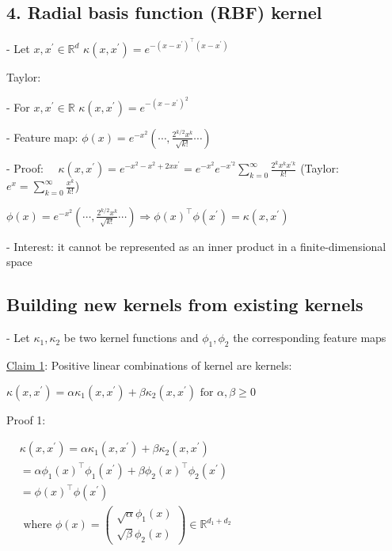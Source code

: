 \subsection*{4. Radial basis function (RBF) kernel}
- Let $x, x^{\prime} \in \mathbb{R}^{d}$
$
\kappa\left(x, x^{\prime}\right)=e^{-\left(x-x^{\prime}\right)^{\top}\left(x-x^{\prime}\right)}
$

Taylor: 

- For $x, x^{\prime} \in \mathbb{R}$
$
\kappa\left(x, x^{\prime}\right)=e^{-\left(x-x^{\prime}\right)^{2}}
$

- Feature map:
$
\phi(x)=e^{-x^{2}}\left(\cdots, \frac{2^{k / 2} x^{k}}{\sqrt{k !}} \cdots\right)
$

- Proof: $\quad \kappa\left(x, x^{\prime}\right)=e^{-x^{2}-x^{2}+2 x x^{\prime}}
=e^{-x^{2}} e^{-x^{\prime 2}} \sum_{k=0}^{\infty} \frac{2^{k} x^{k} x^{\prime k}}{k !}$
(Taylor: $e^{x}=\sum_{k=0}^{\infty}\frac{x^{k}}{k!}$)

$
\phi(x)=e^{-x^{2}}\left(\cdots, \frac{2^{k / 2} x^{k}}{\sqrt{k !}} \cdots\right) \Longrightarrow \phi(x)^{\top} \phi\left(x^{\prime}\right)=\kappa\left(x, x^{\prime}\right)
$

- Interest: it cannot be represented as an inner product in a finite-dimensional space

\subsection*{Building new kernels from existing kernels}
- Let $\kappa_{1}, \kappa_{2}$ be two kernel functions and $\phi_{1}, \phi_{2}$ the corresponding feature maps

\underline{Claim 1}: Positive linear combinations of kernel are kernels:

$
\kappa\left(x, x^{\prime}\right)=\alpha \kappa_{1}\left(x, x^{\prime}\right)+\beta \kappa_{2}\left(x, x^{\prime}\right) \text { for } \alpha, \beta \geq 0
$

Proof 1: 

$
\begin{aligned}
& \kappa\left(x, x^{\prime}\right)=\alpha \kappa_{1}\left(x, x^{\prime}\right)+\beta \kappa_{2}\left(x, x^{\prime}\right) \\
& =\alpha \phi_{1}(x)^{\top} \phi_{1}\left(x^{\prime}\right)+\beta \phi_{2}(x)^{\top} \phi_{2}\left(x^{\prime}\right) \\
& =\phi(x)^{\top} \phi\left(x^{\prime}\right) \\
& \text { where } \phi(x)=\left(\begin{array}{c}
\sqrt{\alpha} \phi_{1}(x) \\
\sqrt{\beta} \phi_{2}(x)
\end{array}\right) \in \mathbb{R}^{d_{1}+d_{2}}
\end{aligned}
$

